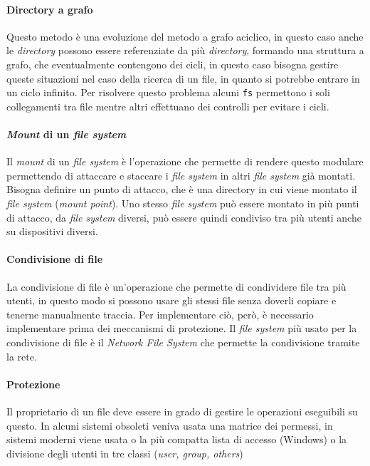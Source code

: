         \paragraph{Directory a grafo} Questo metodo è una evoluzione del metodo a grafo aciclico, in questo caso anche le \textit{directory} possono essere referenziate da più \textit{directory}, formando una struttura a grafo, che eventualmente contengono dei cicli, in questo caso bisogna gestire queste situazioni nel caso della ricerca di un file, in quanto si potrebbe entrare in un ciclo infinito. Per risolvere questo problema alcuni \texttt{fs} permettono i soli collegamenti tra file mentre altri effettuano dei controlli per evitare i cicli.
    
    \paragraph{\textit{Mount} di un \textit{file system}} Il \textit{mount} di un \textit{file system} è l'operazione che permette di rendere questo modulare permettendo di attaccare e staccare i \textit{file system} in altri \textit{file system} già montati. Bisogna definire un punto di attacco, che è una directory in cui viene montato il \textit{file system} (\textit{mount point}). Uno stesso \textit{file system} può essere montato in più punti di attacco, da \textit{file system} diversi, può essere quindi condiviso tra più utenti anche su dispositivi diversi.
    \paragraph{Condivisione di file} La condivisione di file è un'operazione che permette di condividere file tra più utenti, in questo modo si possono usare gli stessi file senza doverli copiare e tenerne manualmente traccia. Per implementare ciò, però, è necessario implementare prima dei meccanismi di protezione. Il \textit{file system} più usato per la condivisione di file è il \textit{Network File System} che permette la condivisione tramite la rete.
    \paragraph{Protezione} Il proprietario di un file deve essere in grado di gestire le operazioni eseguibili su questo. In alcuni sistemi obsoleti veniva usata una matrice dei permessi, in sistemi moderni viene usata o la più compatta lista di accesso (Windows) o la divisione degli utenti in tre classi (\textit{user, group, others})
